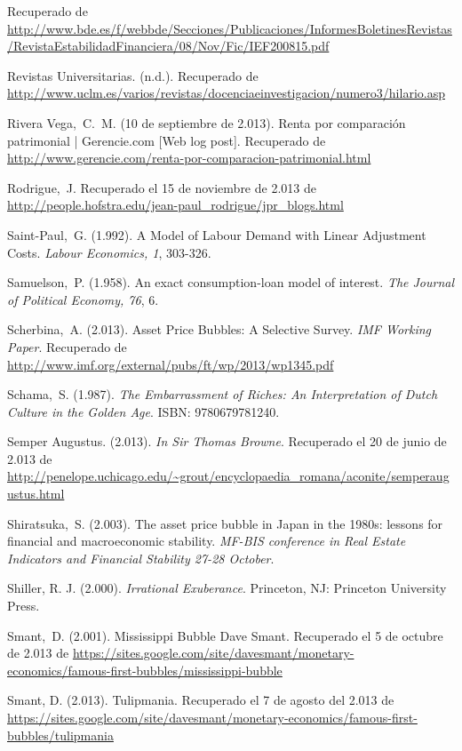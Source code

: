 \begin{thebibliography}{11}
	\bibitem{}
		Recuperado de \url{http://www.bde.es/f/webbde/Secciones/Publicaciones/InformesBoletinesRevistas/RevistaEstabilidadFinanciera/08/Nov/Fic/IEF200815.pdf}

	\bibitem{}
		Revistas Universitarias. (n.d.). Recuperado de \url{http://www.uclm.es/varios/revistas/docenciaeinvestigacion/numero3/hilario.asp}

	\bibitem{}
		Rivera Vega, C. M. (10 de septiembre de 2.013). Renta por comparación patrimonial | Gerencie.com [Web log post]. Recuperado de \url{http://www.gerencie.com/renta-por-comparacion-patrimonial.html}

	\bibitem{}
		Rodrigue, J. Recuperado el 15 de noviembre de 2.013 de \url{http://people.hofstra.edu/jean-paul\_rodrigue/jpr\_blogs.html}

	\bibitem{}
		Saint-Paul, G. (1.992). A Model of Labour Demand with Linear Adjustment Costs. \emph{Labour Economics, 1}, 303-326.

	\bibitem{}
		Samuelson, P. (1.958). An exact consumption-loan model of interest. \emph{The Journal of Political Economy, 76}, 6. 

	\bibitem{}
		Scherbina, A. (2.013). Asset Price Bubbles: A Selective Survey. \emph{IMF Working Paper}. Recuperado de \url{http://www.imf.org/external/pubs/ft/wp/2013/wp1345.pdf}

	\bibitem{}
		Schama, S. (1.987). \emph{The Embarrassment of Riches: An Interpretation of Dutch Culture in the Golden Age}. ISBN: 9780679781240.

	\bibitem{}
		Semper Augustus. (2.013). \emph{In Sir Thomas Browne}. Recuperado el 20 de junio de 2.013 de \url{http://penelope.uchicago.edu/~grout/encyclopaedia\_romana/aconite/semperaugustus.html}

	\bibitem{}
		Shiratsuka, S. (2.003). The asset price bubble in Japan in the 1980s: lessons for financial and macroeconomic stability. \emph{MF-BIS conference in Real Estate Indicators and Financial Stability 27-28 October}. 

	\bibitem{}
		Shiller, R. J. (2.000). \emph{Irrational Exuberance}. Princeton, NJ: Princeton University Press.

	\bibitem{}
		Smant, D. (2.001). Mississippi Bubble Dave Smant. Recuperado el 5 de octubre de 2.013 de \url{https://sites.google.com/site/davesmant/monetary-economics/famous-first-bubbles/mississippi-bubble}

	\bibitem{}
		Smant, D. (2.013). Tulipmania. Recuperado el 7 de agosto del 2.013 de \url{https://sites.google.com/site/davesmant/monetary-economics/famous-first-bubbles/tulipmania}


\end{thebibliography}
